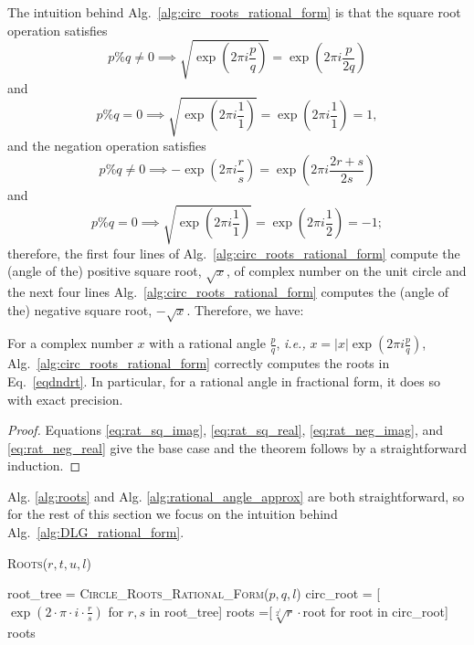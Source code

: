 \documentclass[runningheads]{llncs}
\begin{document}
The intuition behind Alg.~\ref{alg:circ_roots_rational_form} is that the square root operation satisfies
\begin{equation}\label{eq:rat_sq_imag}
p \% q \neq  0 \implies   \sqrt{\exp \left(2 \pi i \frac{p}{q}\right)}  = \exp \left(2 \pi i \frac{p}{2q}\right)
\end{equation}
and
\begin{equation}\label{eq:rat_sq_real}
p \% q = 0 \implies   \sqrt{\exp \left(2 \pi i \frac{1}{1}\right)}  = \exp \left(2 \pi i \frac{1}{1}\right) = 1,
\end{equation}
and the negation operation satisfies
\begin{equation}\label{eq:rat_neg_imag}
p \% q \neq  0 \implies   -\exp \left(2 \pi i \frac{r}{s}\right)  = \exp \left(2 \pi i \frac{2r+s} {2s}\right)
\end{equation}
and
\begin{equation}\label{eq:rat_neg_real}
p \% q = 0 \implies   \sqrt{\exp \left(2 \pi i \frac{1}{1}\right)}  = \exp \left(2 \pi i \frac{1}{2}\right) = -1;
\end{equation}
therefore, the first four lines of Alg.~\ref{alg:circ_roots_rational_form} compute the (angle of the) positive square root, $\sqrt{x}$, of complex number on the unit circle and the next four lines Alg.~\ref{alg:circ_roots_rational_form} computes the (angle of the) negative square root, $-\sqrt{x}$. Therefore, we have:
\begin{theorem}\label{thm:rat_root_correctness}
  For a complex number $x$ with a rational angle $\frac{p}{q}$, \emph{i.e.,} $x = |x|\exp \left(2 \pi i \frac{p}{q}\right)$, Alg.~\ref{alg:circ_roots_rational_form} correctly computes the roots in Eq.~\ref{eqdndrt}. In particular, for a rational angle in fractional form, it does so with exact precision.
\end{theorem}
\begin{proof}
Equations \ref{eq:rat_sq_imag}, \ref{eq:rat_sq_real}, \ref{eq:rat_neg_imag}, and \ref{eq:rat_neg_real} give the base case and the theorem follows by a straightforward induction.
\end{proof}

Alg. \ref{alg:roots} and Alg. \ref{alg:rational_angle_approx} are both straightforward, so for the rest of this section we focus on the intuition behind Alg.~\ref{alg:DLG_rational_form}.

\begin{algorithm}
\caption{\textsc{Roots}($r,t,u,l$)}
\label{alg:roots}
\begin{algorithmic}
\STATE root\_tree = \textsc{Circle\_Roots\_Rational\_Form}($p,q,l$)
\STATE circ\_root = [$\exp\left(2\cdot\pi\cdot i \cdot \frac{r}{s}\right)$ for $r,s$ in root\_tree]
\STATE roots =[$\sqrt[2^l]{r}\cdot$root for root in circ\_root]
\RETURN roots
\end{algorithmic}
\end{algorithm}
\end{document}
